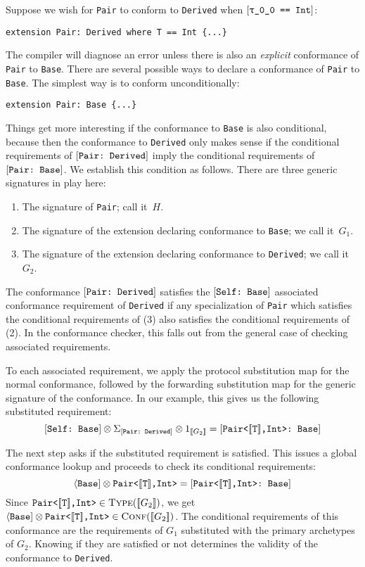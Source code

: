 \documentclass[../generics]{subfiles}
\begin{document}
Suppose we wish for \texttt{Pair} to conform to \texttt{Derived} when $\SameReq{\rT}{Int}$:
\begin{Verbatim}
extension Pair: Derived where T == Int {...}
\end{Verbatim}
The compiler will diagnose an error unless there is also an \emph{explicit} conformance of \texttt{Pair} to \texttt{Base}. There are several possible ways to declare a conformance of \texttt{Pair} to \texttt{Base}. The simplest way is to conform unconditionally:
\begin{Verbatim}
extension Pair: Base {...}
\end{Verbatim}
Things get more interesting if the conformance to \texttt{Base} is also conditional, because then the conformance to \texttt{Derived} only makes sense if the conditional requirements of $[\texttt{Pair:~Derived}]$ imply the conditional requirements of $[\texttt{Pair:~Base}]$. We establish this condition as follows. There are three generic signatures in play here:
\begin{enumerate}
\item The signature of \texttt{Pair}; call it~$H$.
\item The signature of the extension declaring conformance to \texttt{Base}; we call it~$G_1$.
\item The signature of the extension declaring conformance to \texttt{Derived}; we call it~$G_2$.
\end{enumerate}
The conformance $[\texttt{Pair:~Derived}]$ satisfies the $[\texttt{Self:~Base}]$ associated conformance requirement of \texttt{Derived} if any specialization of \verb|Pair| which satisfies the conditional requirements of (3) also satisfies the conditional requirements of (2). In the conformance checker, this falls out from the general case of checking associated requirements.

To each associated requirement, we apply the protocol substitution map for the normal conformance, followed by the forwarding substitution map for the generic signature of the conformance. In our example, this gives us the following substituted requirement:
\[
[\texttt{Self:~Base}]\otimes\Sigma_{[\texttt{Pair:~Derived}]}\otimes 1_{[\![G_2]\!]} = [\texttt{Pair<$[\![\texttt{T}]\!]$,Int>:~Base}]
\]

The next step asks  if the substituted requirement is satisfied. This issues a global conformance lookup and proceeds to check its conditional requirements:
\[\langle\texttt{Base}]\otimes \texttt{Pair<$[\![\texttt{T}]\!]$,Int>} = [\texttt{\texttt{Pair<$[\![\texttt{T}]\!]$,Int>}:~Base}] \]
Since $\texttt{Pair<$[\![\texttt{T}]\!]$,Int>}\in\textsc{Type}({[\![G_2]\!]})$, we get $\langle\texttt{Base}]\otimes \texttt{Pair<$[\![\texttt{T}]\!]$,Int>}\in\textsc{Conf}({[\![G_2]\!]})$. The conditional requirements of this conformance are the requirements of $G_1$ substituted with the primary archetypes of $G_2$. Knowing if they are satisfied or not determines the validity of the conformance to \texttt{Derived}.
\end{document}
